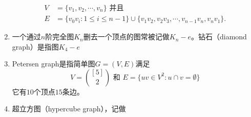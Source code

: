 \begin{definition}
\begin{enumerate}
		\begin{equation*}
			\begin{split}
				V &= \{v_1, v_2,\cdots, v_n\}\text{ 并且 }\\
				E &= \{v_0v_i: 1\leq i \leq n-1\}\cup \{v_1v_2, v_2v_3,\cdots, v_{n-1}v_n, v_nv_1\}.
			\end{split}
		\end{equation*}
		\item 一个通过$n$阶完全图$K_n$删去一个顶点的图常被记做$K_n - e$。钻石（diamond graph）是指图$K_4 - e$
		\item Petersen graph是指简单图$G = (V, E)$满足
		\begin{equation*}
			V = \binom{[5]}{2}\text{ 和 }E = \{uv\in V^2: u\cap v =\emptyset\}
		\end{equation*}
		它有$10$个顶点$15$条边。
		\item 超立方图（hypercube graph），记做
	\end{enumerate}
\end{definition}